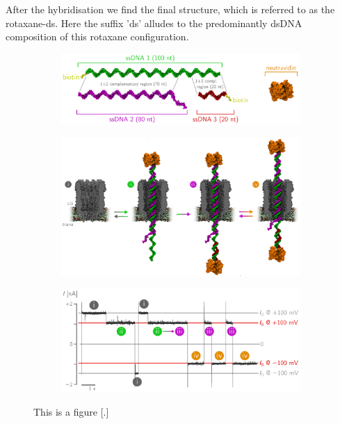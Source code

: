 After the hybridisation we find the final structure, which is referred to as the
rotaxane-ds. Here the suffix 'ds' alludes to the predominantly dsDNA composition of
this rotaxane configuration.\\


\begin{figure}[ht!]
  \begin{centering}
  \begin{subfigure}[t]{\dimexpr.92\linewidth-1.3em\relax}
  \centering
  \includegraphics[width=\linewidth,valign=t]{Figures/RConstruction1.png}
  \end{subfigure}%
  \vspace{0.5cm}
  \begin{subfigure}[t]{\dimexpr.92\linewidth-1.3em\relax}
  \centering
  \includegraphics[width=\linewidth,valign=t]{Figures/RConstruction2.png}
  \end{subfigure}%
  \vspace{0.5cm}
  \begin{subfigure}[t]{\dimexpr.92\linewidth-1.3em\relax}
  \centering
  \includegraphics[width=\linewidth,valign=t]{Figures/RConstruction3.png}
  \end{subfigure}
  \caption{This is a figure [.]}
  \label{fig:test}
  \end{centering}
\end{figure}


\newpage
